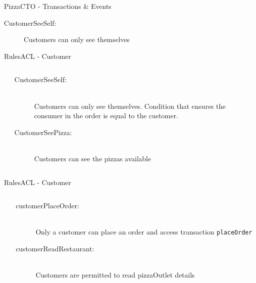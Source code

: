 \documentclass[pdf,table]{beamer}
\begin{document}
\begin{frame}{Pizza}{CTO - Transactions \& Events}
	
\end{frame}

\begin{frame}
	\begin{description}
		\item[CustomerSeeSelf:] Customers can only see themselves
	\end{description}
\end{frame}

\begin{frame}{Rules}{ACL - Customer}
	\begin{columns}[T]
		\begin{column}{0.50\textwidth}
			
		\end{column}
		\begin{column}{0.45\textwidth}
		\begin{description}
			\item[CustomerSeeSelf:] \hfill \\ Customers can only see themselves. Condition that ensures the consumer in the order is equal to the customer.
			\item[CustomerSeePizza:] \hfill \\ Customers can see the pizzas available 
		\end{description}	
	\end{column}
	\end{columns}	
\end{frame}


\begin{frame}{Rules}{ACL - Customer}
	\begin{columns}[T]
		\begin{column}{0.50\textwidth}
			
		\end{column}
		\begin{column}{0.45\textwidth}
		\begin{description}
			\item[customerPlaceOrder:] \hfill \\ Only a customer can place an order and access transaction {\tt placeOrder}
			\item[customerReadRestaurant:] \hfill \\ Customers are permitted to read pizzaOutlet details
		\end{description}	
	\end{column}
	\end{columns}	
\end{frame}
\end{document}
